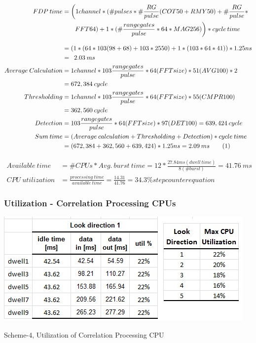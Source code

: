 \begin{align*}
	FDP \: time &= \bigg(1channel * (\#pulses * \# \frac{RG}{pulse} (COT50 + RMY50) + \# \frac{RG}{pulse} * \\
		& \qquad FFT64) + 1 * (\# \frac{range gates}{pulse} * 64 * MAG256)\bigg) * cycle \, time \\[0.3cm]
		&= (1 * (64 * 103 (98 + 68) + 103 * 2550) + 1 * (103 * 64 * 41)) * 1.25ns \\
		&= \enspace 2.03 \: ms \\
		Average \: Calculation &= 1channel * 103 \frac{range gates}{pulse} * 64(FFTsize) * 51(AVG100) * 2 \\
		&=  672,384 \: cycle \\
		Thresholding &= 1channel * 103 \frac{range gates}{pulse} * 64(FFTsize) * 55(CMPR100) \\
		&= 362,560 \: cycle \\
		Detection &= 103 \frac{range gates}{pulse} * 64(FFTsize) * 97(DET100) = 639,424 \: cycle \\
		Sum \: time &= (Average \: calculation + Thresholding + Detection) * cycle \: time \\
		&= (672,384 + 362,560 + 639,424) * 1.25ns = 2.09 \: ms	\stepcounter{equation}\tag{\theequation} 
\end{align*}

\begin{align*}
	Available \: time &= \#CPUs * Avg. \: burst \: time = 12 * \frac{27.84ms (dwell \: time)}{8(\#burst)} = 41.76 \: ms\\[0.3cm]
	CPU \: utilization &= \frac{processing \: time}{available \: time} = \frac{14.31}{41.76} = 34.3\% stepcounter{equation}\tag{\theequation} 
\end{align*}


\subsubsection{Utilization - Correlation Processing CPUs}
\begin{table}[h!]
	\centering
	\includegraphics[]{figures/scheme5_mul_cpu_util}
	\caption{Scheme-4, Utilization of Correlation Processing CPU}
	\label{fig:mm:scheme5_mul_cpu_util}
\end{table}

